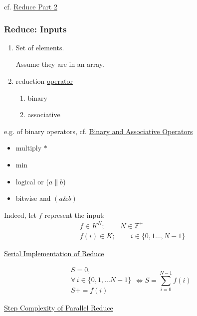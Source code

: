 \documentclass[10pt]{amsart}
\begin{document}
\begin{multicols*}{2}
cf. \href{https://classroom.udacity.com/courses/cs344/lessons/86719951/concepts/875579020923#}{Reduce Part 2}

\subsubsection*{Reduce: Inputs}

\begin{enumerate}
\item Set of elements.

  Assume they are in an array.
\item reduction \underline{operator}
  \begin{enumerate}
    \item binary 
    \item associative
    \end{enumerate}
  \end{enumerate}

e.g. of binary operators, cf. \href{https://classroom.udacity.com/courses/cs344/lessons/86719951/concepts/878363880923#}{Binary and Associative Operators}
\begin{itemize}
  \item multiply $*$ 
  \item min
  \item logical or ($a \parallel b$)
    \item bitwise and $(a\& b)$
  \end{itemize}

Indeed, let $f$ represent the input:
\[
\begin{aligned}
  & f \in K^N ; \qquad \, N \in \mathbb{Z}^+ \\ 
  & f(i) \in K ; \qquad \, i \in \lbrace 0 ,1 \dots , N-1 \rbrace
\end{aligned}
\]

\href{https://classroom.udacity.com/courses/cs344/lessons/86719951/concepts/876789040923#}{Serial Implementation of Reduce}

\[
\begin{gathered}
  S = 0, \\ 
  \forall \, i \in \lbrace 0 , 1 , \dots N-1 \rbrace \\
  S += f(i) 
\end{gathered} \Longleftrightarrow S = \sum_{i=0}^{N-1} f(i)
\]


\href{https://classroom.udacity.com/courses/cs344/lessons/86719951/concepts/877097870923}{Step Complexity of Parallel Reduce}


\end{multicols*}
\end{document}
